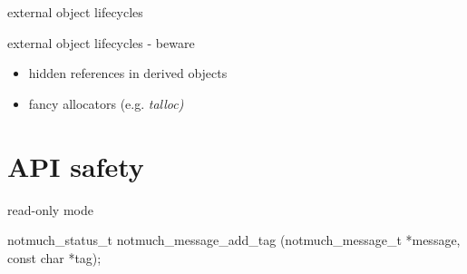 \documentclass[ignorenonframetext,aspectratio=169]{beamer}
\newenvironment{Shaded}{}{}
\newcommand{\KeywordTok}[1]{\textcolor[rgb]{0.00,0.44,0.13}{\textbf{{#1}}}}
\newcommand{\DataTypeTok}[1]{\textcolor[rgb]{0.56,0.13,0.00}{{#1}}}
\newcommand{\StringTok}[1]{\textcolor[rgb]{0.25,0.44,0.63}{{#1}}}
\newcommand{\OtherTok}[1]{\textcolor[rgb]{0.00,0.44,0.13}{{#1}}}
\newcommand{\FunctionTok}[1]{\textcolor[rgb]{0.02,0.16,0.49}{{#1}}}
\newcommand{\NormalTok}[1]{{#1}}
\providecommand{\tightlist}{%
  \setlength{\itemsep}{0pt}\setlength{\parskip}{0pt}}
\newcommand\greyuline{\bgroup\markoverwith
    {\textcolor{lightgray}{\rule[-0.5ex]{2pt}{0.4pt}}}\ULon}
\begin{document}
\begin{frame}[fragile]{external object lifecycles}

\begin{Shaded}
\end{Shaded}

\end{frame}

\begin{frame}{external object lifecycles - beware}
\begin{itemize}
\tightlist
\item
  hidden references in derived objects
\item
  fancy allocators (e.g. \em{talloc})
\end{itemize}
\end{frame}

\section{API safety}\label{api-safety}

\begin{frame}[fragile]{read-only mode}

\begin{Shaded}
\begin{Highlighting}[]
\NormalTok{notmuch_status_t}
\NormalTok{notmuch_message_add_tag (notmuch_message_t *message, }\DataTypeTok{const} \DataTypeTok{char} \NormalTok{*tag);}
\end{Highlighting}
\end{Shaded}

\end{frame}
\end{document}
